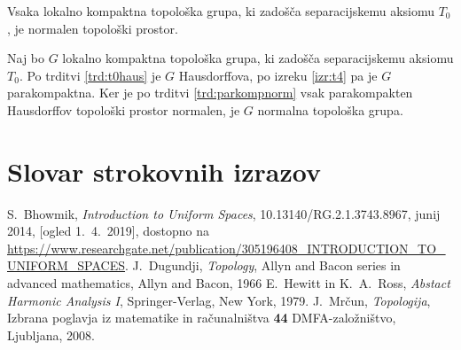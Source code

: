 \documentclass[mat1]{fmfdelo}
\begin{document}
\begin{posledica}
Vsaka lokalno kompaktna topološka grupa, ki zadošča separacijskemu aksiomu $T_0$, je normalen topološki prostor.
\end{posledica}

\begin{dokaz}
Naj bo $G$ lokalno kompaktna topološka grupa, ki zadošča separacijskemu aksiomu $T_0$. Po trditvi \ref{trd:t0haus} je $G$ Hausdorffova, po izreku \ref{izr:t4} pa je $G$ parakompaktna. Ker je po trditvi \ref{trd:parkompnorm} vsak parakompakten Hausdorffov topološki prostor normalen, je $G$ normalna topološka grupa.
\end{dokaz}

\section*{Slovar strokovnih izrazov}


\begin{thebibliography}{99}

S.~Bhowmik, \emph{Introduction to Uniform Spaces}, 10.13140/RG.2.1.3743.8967, junij 2014, [ogled 1.~4.~2019], dostopno na \url{https://www.researchgate.net/publication/305196408_INTRODUCTION_TO_UNIFORM_SPACES}.
J.~Dugundji, \emph{Topology}, Allyn and Bacon series in advanced mathematics, Allyn and Bacon, 1966
E.~Hewitt in K.~A.~Ross, \emph{Abstact Harmonic Analysis I}, Springer-Verlag, New York, 1979.
J.~Mrčun, \emph{Topologija}, Izbrana poglavja iz matematike in računalništva \textbf{44} DMFA-založništvo, Ljubljana, 2008.

\end{thebibliography}
\end{document}
